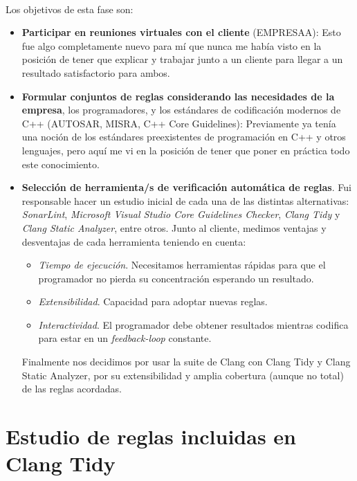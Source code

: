 \documentclass[12pt]{extreport} %
\begin{document}
\paragraph{}
Los objetivos de esta fase son:
\begin{itemize}
\item \textbf{Participar en reuniones virtuales con el cliente}
  (EMPRESAA): Esto fue algo completamente nuevo para mí que nunca me
  había visto en la posición de tener que explicar y trabajar junto a
  un cliente para llegar a un resultado satisfactorio para ambos.

\item \textbf{Formular conjuntos de reglas considerando las
  necesidades de la empresa}, los programadores, y los estándares de
  codificación modernos de C++ (AUTOSAR, MISRA, C++ Core Guidelines):
  Previamente ya tenía una noción de los estándares preexistentes de
  programación en C++ y otros lenguajes, pero aquí me vi en la
  posición de tener que poner en práctica todo este conocimiento.

\item \textbf{Selección de herramienta/s de verificación automática de
  reglas}. Fui responsable hacer un estudio inicial de cada una de las
  distintas alternativas: \emph{SonarLint}, \emph{Microsoft Visual
  Studio Core Guidelines Checker}, \emph{Clang Tidy} y \emph{Clang
  Static Analyzer}, entre otros. Junto al cliente, medimos ventajas y
  desventajas de cada herramienta teniendo en cuenta:
  \begin{itemize}
  \item \emph{Tiempo de ejecución}. Necesitamos herramientas rápidas
    para que el programador no pierda su concentración esperando un
    resultado.
  \item \emph{Extensibilidad}. Capacidad para adoptar nuevas reglas.
  \item \emph{Interactividad}. El programador debe obtener resultados
    mientras codifica para estar en un \emph{feedback-loop} constante.
  \end{itemize}
  Finalmente nos decidimos por usar la suite de Clang con Clang Tidy y
  Clang Static Analyzer, por su extensibilidad y amplia cobertura
  (aunque no total) de las reglas acordadas.
\end{itemize}

\section{Estudio de reglas incluidas en Clang Tidy}
\label{fase-2}
\end{document}
